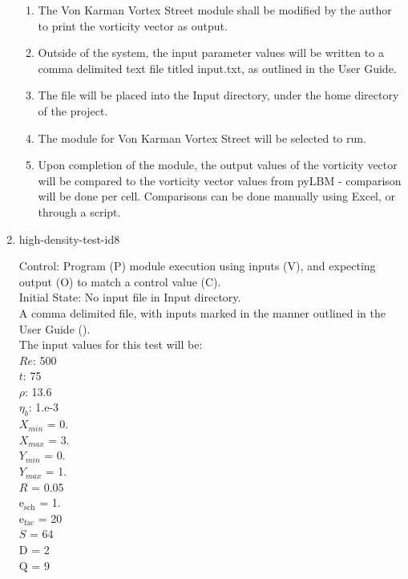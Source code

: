 \documentclass[12pt, titlepage]{article}
\begin{document}
\begin{enumerate}
\begin{enumerate}
\item The Von Karman Vortex Street module shall be modified by the author to print the vorticity vector as output.
\item Outside of the system, the input parameter values will be written to a comma delimited text file titled input.txt, as outlined in the User Guide.
\item The file will be placed into the Input directory, under the home directory of the project.
\item The module for Von Karman Vortex Street will be selected to run.
\item Upon completion of the module, the output values of the vorticity vector will be compared to the vorticity vector values from pyLBM - comparison will be done per cell. Comparisons can be done manually using Excel, or through a script.\\
\end{enumerate}

\item{high-density-test-id8\\}

Control: Program (P) module execution using inputs (V), and expecting output (O) to match a control value (C).\\
					
Initial State: No input file in Input directory.\\
					
A comma delimited file, with inputs marked in the manner outlined in the User Guide (\citet{LBM_UserGuide_PM}).\\The input values for this test will be:\\
$Re$: 500\\
$t$: 75\\
$\rho$: 13.6\\
$\eta_b$: 1.e-3\\
$X_{min}$ = 0.\\
$X_{max}$ = 3.\\
$Y_{min}$ = 0.\\
$Y_{max}$ = 1.\\
$R$ = 0.05\\
$\mathrm{e_{sch}}$ = 1.\\
$\mathrm{e_{fac}}$ = 20\\
$S$ = 64\\
$\mathrm{D}$ = 2\\
$\mathrm{Q}$ = 9\\


\end{enumerate}
\end{document}
